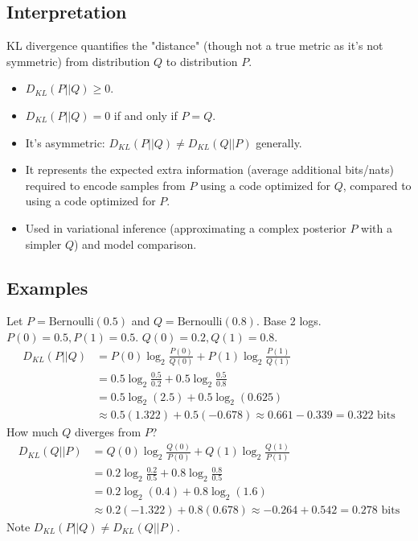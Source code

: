 \documentclass{article}
\begin{document}
\subsection*{Interpretation}
KL divergence quantifies the "distance" (though not a true metric as it's not symmetric) from distribution $Q$ to distribution $P$.
\begin{itemize}
    \item $D_{KL}(P || Q) \ge 0$.
    \item $D_{KL}(P || Q) = 0$ if and only if $P = Q$.
    \item It's asymmetric: $D_{KL}(P || Q) \neq D_{KL}(Q || P)$ generally.
    \item It represents the expected extra information (average additional bits/nats) required to encode samples from $P$ using a code optimized for $Q$, compared to using a code optimized for $P$.
    \item Used in variational inference (approximating a complex posterior $P$ with a simpler $Q$) and model comparison.
\end{itemize}

\subsection*{Examples}
Let $P = \text{Bernoulli}(0.5)$ and $Q = \text{Bernoulli}(0.8)$. Base 2 logs.
$P(0)=0.5, P(1)=0.5$. $Q(0)=0.2, Q(1)=0.8$.
\begin{align*} D_{KL}(P || Q) &= P(0) \log_2 \frac{P(0)}{Q(0)} + P(1) \log_2 \frac{P(1)}{Q(1)} \\ &= 0.5 \log_2 \frac{0.5}{0.2} + 0.5 \log_2 \frac{0.5}{0.8} \\ &= 0.5 \log_2 (2.5) + 0.5 \log_2 (0.625) \\ &\approx 0.5(1.322) + 0.5(-0.678) \approx 0.661 - 0.339 = 0.322 \text{ bits} \end{align*}
How much $Q$ diverges from $P$?
\begin{align*} D_{KL}(Q || P) &= Q(0) \log_2 \frac{Q(0)}{P(0)} + Q(1) \log_2 \frac{Q(1)}{P(1)} \\ &= 0.2 \log_2 \frac{0.2}{0.5} + 0.8 \log_2 \frac{0.8}{0.5} \\ &= 0.2 \log_2 (0.4) + 0.8 \log_2 (1.6) \\ &\approx 0.2(-1.322) + 0.8(0.678) \approx -0.264 + 0.542 = 0.278 \text{ bits} \end{align*}
Note $D_{KL}(P || Q) \neq D_{KL}(Q || P)$.

\end{document}
